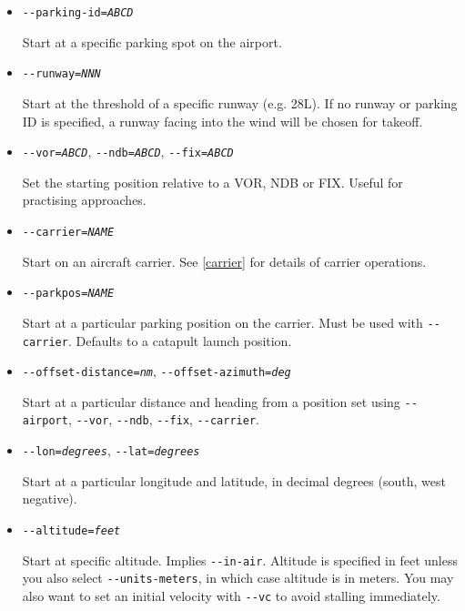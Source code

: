\begin{itemize}
{\begin{itemize}
  Start at a specific . The airport is specified by its ICAO code, e.g. \texttt{-$ $-airport=KJFK} for
  JFK airport in New York. For US airport without an ICAO code, try prefixing the 3 character code
  with `K'.

  \item{\texttt{-$ $-parking-id={\it ABCD}}}

  Start at a specific parking spot on the airport.

  \item{\texttt{-$ $-runway={\it NNN}}}

  Start at the threshold of a specific runway (e.g. 28L). If no runway or parking ID is
  specified, a runway facing into the wind will be chosen for takeoff.

  \item{\texttt{-$ $-vor={\it ABCD}}, \texttt{-$ $-ndb={\it ABCD}}, \texttt{-$ $-fix={\it ABCD}}}

  Set the starting position relative to a VOR, NDB or FIX. Useful for practising approaches.

  \item{\texttt{-$ $-carrier={\it NAME}}}

  Start on an aircraft carrier. See \ref{carrier} for details of carrier operations.

  \item{\texttt{-$ $-parkpos={\it NAME}}}

  Start at a particular parking position on the carrier. Must be used with \texttt{-$ $-carrier}.
  Defaults to a catapult launch position.

  \item{\texttt{-$ $-offset-distance={\it nm}}, \texttt{-$ $-offset-azimuth={\it deg}}}

  Start at a particular distance and heading from a position set using \texttt{-$ $-airport},
  \texttt{-$ $-vor}, \texttt{-$ $-ndb}, \texttt{-$ $-fix}, \texttt{-$ $-carrier}.

  \item{\texttt{-$ $-lon={\it degrees}}, \texttt{-$ $-lat={\it degrees}}}

  Start at a particular longitude and latitude, in decimal degrees (south, west negative).

  \item{\texttt{-$ $-altitude={\it feet}}}

  Start at specific altitude. Implies \texttt{-$ $-in-air}. Altitude is specified in feet unless you
  also select \texttt{-$ $-units-meters}, in which case altitude is in meters. You may also want to set
  an initial velocity with \texttt{-$ $-vc} to avoid stalling immediately.


\end{itemize}}
\end{itemize}

